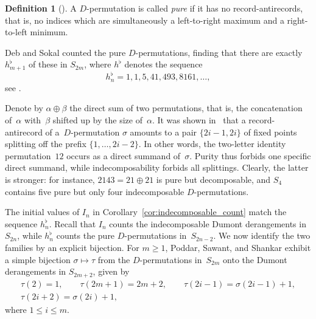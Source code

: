 \documentclass[10pt,a4paper]{amsart}
\numberwithin{equation}{section}
\theoremstyle{definition}
\newtheorem{Definition}[Theorem]{Definition}
\begin{document}
\begin{Definition}[\cite{DebSokal2024}]
	\label{def:pure_D_permutations}
	A $D$-permutation is called \emph{pure} if it has no
	record-antirecords, that is, no indices which are simultaneously a
	left-to-right maximum and a right-to-left minimum.
\end{Definition}

Deb and Sokal \cite{DebSokal2024} counted the pure $D$-permutations, finding that
there are exactly $h^\flat_{m+1}$ of these in $S_{2m}$, where $h^\flat$
denotes the sequence
\begin{equation*}
	h^\flat_n=1,1,5,41,493,8161,\dots,
\end{equation*}
see \cite[A362111]{OEIS}.

Denote by $\alpha\oplus\beta$ the direct sum of two permutations, that is, the
concatenation of~$\alpha$ with~$\beta$ shifted up by the size of~$\alpha$.
It was shown in~\cite{DebSokal2024} that a record-antirecord of a~$D$-permutation $\sigma$
amounts to a pair $\{2i-1,2i\}$ of fixed points splitting off the prefix
$\{1,\dots,2i-2\}$. In other words, the two-letter identity permutation~$12$ occurs as a direct summand of~$\sigma$.
Purity thus forbids one specific direct summand, while
indecomposability forbids all splittings. Clearly, the latter is stronger: for
instance, $2143=21\oplus21$ is pure but decomposable, and $S_4$ contains
five pure but only four indecomposable $D$-permutations.

The initial values of $I_n$ in Corollary~\ref{cor:indecomposable_count} match the
sequence $h^\flat_n$.
Recall that
$I_n$ counts the
indecomposable Dumont derangements in $S_{2n}$, while $h^\flat_n$
counts the pure $D$-permutations in~$S_{2n-2}$.
We now identify the two families by an explicit bijection.
For $m\ge1$, Poddar, Sawant, and Shankar
\cite[Theorem~6.2]{PoddarSawantShankar2026} exhibit a simple bijection
$\sigma\mapsto\tau$ from the $D$-permutations in~$S_{2m}$ onto the Dumont
derangements in $S_{2m+2}$, given by
\begin{gather}
\tau(2)=1,\qquad \tau(2m+1)=2m+2,\qquad
	\tau(2i-1)=\sigma(2i-1)+1,\nonumber\\
	\tau(2i+2)=\sigma(2i)+1,\label{eq:PSS_map}
\end{gather}
where $1\le i\le m$.
\end{document}
